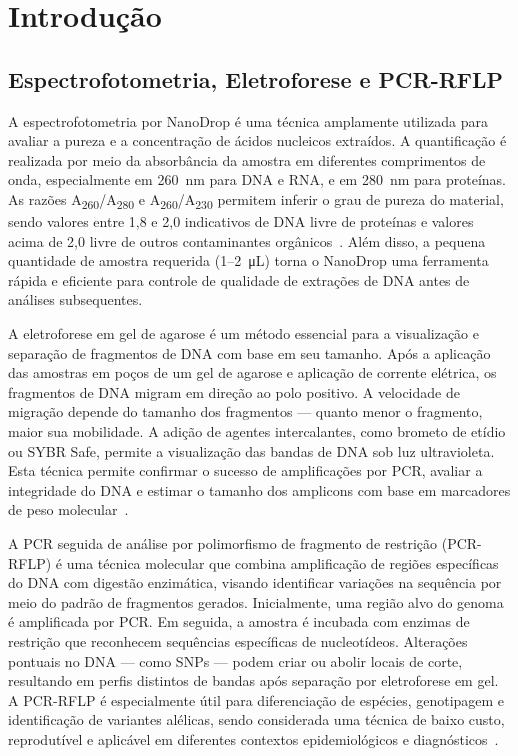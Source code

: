 \section{Introdução}

\subsection{Espectrofotometria, Eletroforese e PCR-RFLP}

A espectrofotometria por NanoDrop é uma técnica amplamente utilizada para avaliar a pureza e a 
concentração de ácidos nucleicos extraídos. A quantificação é realizada por meio da absorbância da 
amostra em diferentes comprimentos de onda, especialmente em \SI{260}{\nano\meter} para DNA e RNA, 
e em \SI{280}{\nano\meter} para proteínas. As razões A\textsubscript{260}/A\textsubscript{280} e A\textsubscript{260}/A\textsubscript{230} permitem 
inferir o grau de pureza do material, sendo valores entre 1{,}8 e 2{,}0 indicativos de DNA livre de proteínas 
e valores acima de 2{,}0 livre de outros contaminantes orgânicos~\cite{nanodrop}. Além disso, a pequena quantidade de amostra requerida (1–2~\si{\micro\liter}) 
torna o NanoDrop uma ferramenta rápida e eficiente para controle de qualidade de extrações de DNA antes de análises subsequentes.

A eletroforese em gel de agarose é um método essencial para a visualização e separação de fragmentos de DNA com base em seu tamanho. 
Após a aplicação das amostras em poços de um gel de agarose e aplicação de corrente elétrica, os fragmentos de DNA migram em direção 
ao polo positivo. A velocidade de migração depende do tamanho dos fragmentos — quanto menor o fragmento, maior sua mobilidade. 
A adição de agentes intercalantes, como brometo de etídio ou SYBR Safe, permite a visualização das bandas de DNA sob luz ultravioleta. 
Esta técnica permite confirmar o sucesso de amplificações por PCR, avaliar a integridade do DNA e estimar o tamanho dos amplicons 
com base em marcadores de peso molecular~\cite{costa1998leishmaniose}.

A PCR seguida de análise por polimorfismo de fragmento de restrição (PCR-RFLP) é uma técnica molecular que combina amplificação de regiões 
específicas do DNA com digestão enzimática, visando identificar variações na sequência por meio do padrão de fragmentos gerados. Inicialmente, 
uma região alvo do genoma é amplificada por PCR. Em seguida, a amostra é incubada com enzimas de restrição que reconhecem sequências específicas 
de nucleotídeos. Alterações pontuais no DNA — como SNPs — podem criar ou abolir locais de corte, resultando em perfis distintos de bandas após separação 
por eletroforese em gel. A PCR-RFLP é especialmente útil para diferenciação de espécies, genotipagem e identificação de variantes alélicas, sendo 
considerada uma técnica de baixo custo, reprodutível e aplicável em diferentes contextos epidemiológicos e diagnósticos~\cite{garcia2005metodos}.
